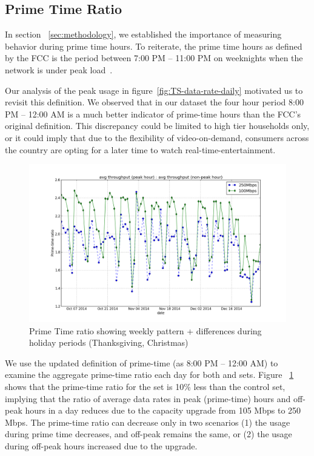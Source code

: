 \subsection{Prime Time Ratio}
\label{subsec:primetime}

In section ~\ref{sec:methodology}, we established the importance of measuring behavior during prime time hours. To reiterate, the prime time hours as defined by the FCC is the period between 7:00 PM -- 11:00 PM on weeknights when the network is under peak load~\cite{fcc2014measuring-broadband}. 

Our analysis of the peak usage in figure~\ref{fig:TS-data-rate-daily} motivated us to revisit this definition. We observed that in our dataset the four hour period 8:00 PM -- 12:00 AM is a much better indicator of prime-time hours than the FCC's original definition. This discrepancy could be limited to high tier households only, or it could imply that due to the flexibility of video-on-demand, consumers across the country are opting for a later time to watch real-time-entertainment. 

\begin{figure}[ht!]
\begin{minipage}{\linewidth}
\centering
\includegraphics[width=\linewidth]{figures/prime-time-ratio-by-date[replace].png}
\caption{Prime Time ratio showing weekly pattern + differences during holiday periods (Thanksgiving, Christmas)}
\label{fig:TS-prime-time-ratio}
\end{minipage}
\end{figure}

We use the updated definition of prime-time (as 8:00 PM -- 12:00 AM) to examine the aggregate prime-time ratio each day for both \test and \control sets. Figure ~\ref{fig:TS-prime-time-ratio} shows that the prime-time ratio for the \test set is 10\% less than the control set, implying that the ratio of average data rates in peak (prime-time) hours and off-peak hours in a day reduces due to the capacity upgrade from 105 Mbps to 250 Mbps. The prime-time ratio can decrease only in two scenarios (1) the usage during prime time decreases, and off-peak remains the same, or (2) the usage during off-peak hours increased due to the upgrade.

